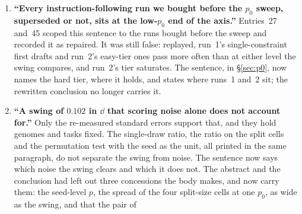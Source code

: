 \documentclass[11pt]{article}
\begin{document}
\begin{enumerate}
    Table~\ref{tab:p0}, and its ``caps $p_0$ at $0.16$'' read run~3's final-draft rate as a cap on
    first drafts. $p_0$ is measured on held-out first drafts while the mechanism acts on the train
    split, whose rates are now printed. The abstract said the optimizer ``never touched'' the
    critique gene, the phrase Paper~III withdrew, and its replacement ``never changed'' was too
    strong as well, since replayed the gene changed on two seeds of two pre-correction runs; the
    discarded first attempt ran without a
    critique on one seed, not on the whole arm; the chronology sentence placed our runs before the
    June posts, which came first; the pointer that withdrew ``unusually informative'' as circular
    named no entry Paper~III has; the budget-floor confound was labelled Paper~III's defect~3, a
    different mechanism; entry~28 counted thirty-six runs at the 320-token cap where the release
    has thirty-seven, because the count missed the one results file without a suffix; arm~D's
    reflection channel was called identical to arm~B's although only arm~D receives
    metric-labelled verdict records; arm~A's re-measurement was offered as a fix although a
    cassette replay cannot differ from itself; and Self-Refine was cited for single-instruction
    prompt search, which it is not.
  \item \textbf{``Every instruction-following run we bought before the $p_0$ sweep, superseded or
    not, sits at the low-$p_0$ end of the axis.''} Entries~27 and~45 scoped this sentence to the
    runs bought before the sweep and recorded it as repaired. It was still false: replayed, run~1's
    single-constraint first drafts and run~2's easy-tier ones pass more often than at either level
    the swing compares, and run~2's tier saturates. The sentence, in \S\ref{sec:p0}, now names
    the hard tier, where it holds, and states where runs~1 and~2 sit; the rewritten conclusion no
    longer carries it.
  \item \textbf{``A swing of $0.102$ in $\dd$ that scoring noise alone does not account for.''}
    Only the re-measured standard errors support that, and they hold genomes and tasks fixed. The
    single-draw ratio, the ratio on the split cells and the permutation test with the seed as the
    unit, all printed in the same paragraph, do not separate the swing from noise. The sentence now
    says which noise the swing clears and which it does not. The abstract and the conclusion had
    left out three concessions the body makes, and now carry them: the seed-level $p$, the
    spread of the four split-size cells at one $p_0$, as wide as the swing, and that the pair of

\end{enumerate}
\end{document}
